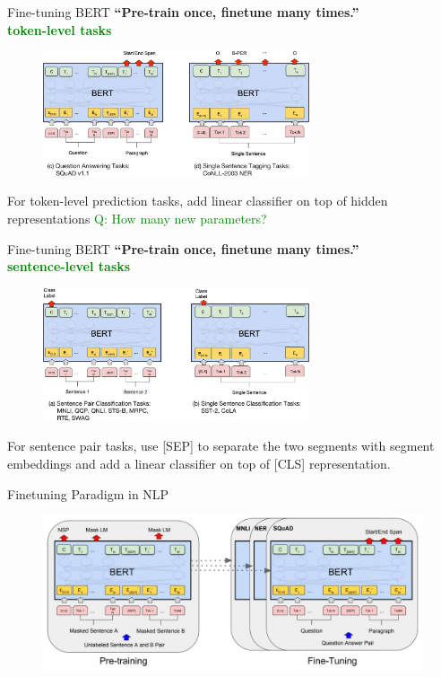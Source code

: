 \documentclass[serif, aspectratio=169]{beamer}
\begin{document}
\begin{frame}{Fine-tuning BERT}
    \centering
    \textbf{``Pre-train once, finetune many times.''} \\
    \textcolor{green}{\textbf{token-level tasks}}
    \begin{figure}
        \centering
        \includegraphics[width=0.7\textwidth]{Figures/Fintuning.png}
    \end{figure}
    For token-level prediction tasks, add linear classifier on top of hidden representations
    \textcolor{green}{Q: How many new parameters?}
\end{frame}

\begin{frame}{Fine-tuning BERT}
    \centering
    \textbf{``Pre-train once, finetune many times.''} \\
    \textcolor{green}{\textbf{sentence-level tasks}}
    \begin{figure}
        \centering
        \includegraphics[width=0.7\textwidth]{Figures/finetuning1.png}
    \end{figure}
    For sentence pair tasks, use [SEP] to separate the two segments with segment embeddings and add a linear classifier on top of [CLS] representation.
\end{frame}

\begin{frame}{Finetuning Paradigm in NLP}
    \begin{figure}
        \centering
        \includegraphics[width=1\textwidth]{Figures/paradaigm.png}
    \end{figure}
\end{frame}
\end{document}
